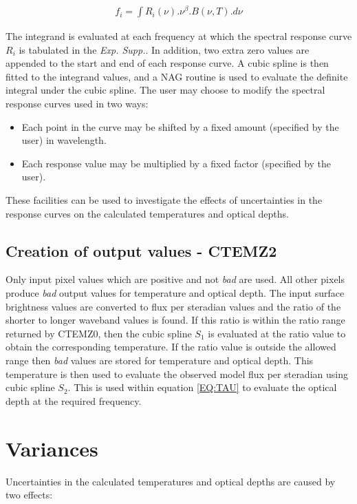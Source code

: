 \begin{eqnarray*}
f_{i} = \int R_{i}(\nu).\nu^{\beta}.B( \nu, T ).d\nu
\end{eqnarray*}

The integrand is evaluated at each frequency at which the spectral response
curve $R_{i}$ is tabulated in the {\em Exp. Supp.}. In addition, two extra
zero values are appended to the start and end of each response curve. A cubic
spline is then fitted to the integrand values, and a {\small NAG} routine is
used to evaluate the definite integral under the cubic spline. The user may
choose to modify the spectral response curves used in two ways:

\begin{itemize}
\item Each point in the curve may be shifted by a fixed amount (specified by the
user) in wavelength.
\item Each response value may be multiplied by a fixed factor (specified by the
user).
\end{itemize}

These facilities can be used to investigate the effects of uncertainties in the
response curves on the calculated temperatures and optical depths.

\subsection{Creation of output values - CTEMZ2}
Only input pixel values which are positive and not {\em bad} are used. All other
pixels produce {\em bad} output values for temperature and optical depth. The
input surface brightness values are converted to flux per steradian values and
the ratio of the shorter to longer waveband values is found. If this ratio is
within the ratio range returned by {\small CTEMZ0}, then the cubic spline
$S_{1}$ is evaluated at the ratio value to obtain the corresponding temperature.
If the ratio value is outside the allowed range then {\em bad} values are stored
for temperature and optical depth. This temperature is then used to evaluate the
observed model flux per steradian using cubic spline $S_{2}$. This is used
within equation \ref{EQ:TAU} to evaluate the optical depth at the required
frequency.

\section{Variances}
Uncertainties in the calculated temperatures and optical depths are caused by
two effects:

